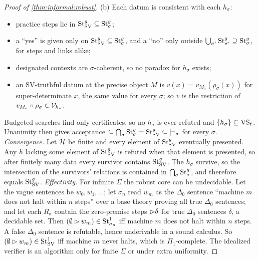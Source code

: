 \begin{proof}[Proof of \cref{thm:informal:robust}]
(b) Each datum is consistent with each $h_\sigma$:
\begin{itemize}
\item practice steps lie in $\mathrm{St}^{g}_{\mathrm{SV}}\subseteq\mathrm{St}^{g}_{\sigma}$;
\item a ``yes'' is given only on $\mathrm{St}^{g}_{\mathrm{SV}}\subseteq\mathrm{St}^{g}_{\sigma}$, and a ``no'' only outside $\bigcup_{\sigma'}\mathrm{St}^{g}_{\sigma'}\supseteq\mathrm{St}^{g}_{\sigma}$, for steps and links alike;
\item designated contexts are $\sigma$-coherent, so no paradox for $h_\sigma$ exists;
\item an SV-truthful datum at the precise object $M$ is $v(x)=v_{M_\sigma}(\rho_\sigma(x))$ for super-determinate $x$, the same value for every $\sigma$; so $v$ is the restriction of $v_{M_\sigma}\circ\rho_\sigma\in\mathcal V_{h_\sigma}$.
\end{itemize}
Budgeted searches find only certificates, so no $h_\sigma$ is ever refuted and $\{h_\sigma\}\subseteq\mathrm{VS}_t$. Unanimity then gives acceptance $\subseteq\bigcap_\sigma\mathrm{St}^{g}_{\sigma}=\mathrm{St}^{g}_{\mathrm{SV}}\subseteq{\models_\sigma}$ for every $\sigma$.
\emph{Convergence.} Let $\mathcal{H}$ be finite and every element of $\mathrm{St}^{g}_{\mathrm{SV}}$ eventually presented. Any $h$ lacking some element of $\mathrm{St}^{g}_{\mathrm{SV}}$ is refuted when that element is presented, so after finitely many data every survivor contains $\mathrm{St}^{g}_{\mathrm{SV}}$. The $h_\sigma$ survive, so the intersection of the survivors' relations is contained in $\bigcap_\sigma\mathrm{St}^{g}_{\sigma}$, and therefore equals $\mathrm{St}^{g}_{\mathrm{SV}}$.
\emph{Effectivity.} For infinite $\Sigma$ the robust core can be undecidable. Let the vague sentences be $w_0,w_1,\dots$; let $\sigma_n$ read $w_m$ as the $\Delta_0$ sentence ``machine $m$ does not halt within $n$ steps'' over a base theory proving all true $\Delta_0$ sentences; and let each $R_\sigma$ contain the zero-premise steps $\rhd\delta$ for true $\Delta_0$ sentences $\delta$, a decidable set. Then $(\emptyset\rhd w_m)\in\mathrm{St}^{1}_{\sigma_n}$ iff machine $m$ does not halt within $n$ steps. A false $\Delta_0$ sentence is refutable, hence underivable in a sound calculus. So $(\emptyset\rhd w_m)\in\mathrm{St}^{1}_{\mathrm{SV}}$ iff machine $m$ never halts, which is $\Pi_1$-complete. The idealized verifier is an algorithm only for finite $\Sigma$ or under extra uniformity.


\end{proof}
